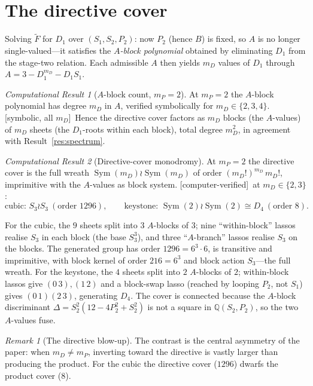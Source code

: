 \documentclass[11pt]{article}
\theoremstyle{plain}
\theoremstyle{definition}
\theoremstyle{remark}
\newtheorem{result}{Computational Result}
\newtheorem{remark}{Remark}
\newcommand{\Symbolic}{\textsf{[symbolic, all $m_D$]}}
\newcommand{\Measured}{\textsf{[computer-verified]}}
\newcommand{\Sym}{\operatorname{Sym}}
\newcommand{\Ftil}{\widetilde{F}}
\newcommand{\Q}{\mathbb{Q}}
\begin{document}
\section{The directive cover}
\label{sec:directive}

Solving $\Ftil$ for $D_1$ over $(S_1,S_2,P_2)$: now $P_2$ (hence $B$) is fixed, so
$A$ is no longer single-valued---it satisfies the \emph{$A$-block polynomial}
obtained by eliminating $D_1$ from the stage-two relation. Each admissible $A$
then yields $m_D$ values of $D_1$ through $A=3-D_1^{m_D}-D_1 S_1$.

\begin{result}[$A$-block count, $m_P=2$]
\label{res:ablock}
At $m_P=2$ the $A$-block polynomial has degree $m_D$ in $A$, verified symbolically
for $m_D\in\{2,3,4\}$. \Symbolic\ Hence the directive cover factors as $m_D$
blocks (the $A$-values) of $m_D$ sheets (the $D_1$-roots within each block), total
degree $m_D^2$, in agreement with Result~\ref{res:spectrum}.
\end{result}

\begin{result}[Directive-cover monodromy]
\label{res:directive}
At $m_P=2$ the directive cover is the full wreath $\Sym(m_D)\wr\Sym(m_D)$ of order
$(m_D!)^{m_D}\,m_D!$, imprimitive with the $A$-values as block system. \Measured\
at $m_D\in\{2,3\}$:
\[
  \text{cubic: } S_3\wr S_3 \ (\text{order } 1296),\qquad
  \text{keystone: } \Sym(2)\wr\Sym(2)\cong D_4 \ (\text{order } 8).
\]
\end{result}

\noindent For the cubic, the $9$ sheets split into $3$ $A$-blocks of $3$; nine
``within-block'' lassos realise $S_3$ in each block (the base $S_3^3$), and three
``$A$-branch'' lassos realise $S_3$ on the blocks. The generated group has order
$1296=6^3\cdot 6$, is transitive and imprimitive, with block kernel of order
$216=6^3$ and block action $S_3$---the full wreath. For the keystone, the $4$
sheets split into $2$ $A$-blocks of $2$; within-block lassos give $(0\,3),(1\,2)$
and a block-swap lasso (reached by looping $P_2$, not $S_1$) gives $(0\,1)(2\,3)$,
generating $D_4$. The cover is connected because the $A$-block discriminant
$\Delta = S_2^2(12-4P_2^2+S_2^2)$ is not a square in $\Q(S_2,P_2)$, so the two
$A$-values fuse.

\begin{remark}[The directive blow-up]
The contrast is the central asymmetry of the paper: when $m_D\neq m_P$, inverting
toward the directive is vastly larger than producing the product. For the cubic
the directive cover ($1296$) dwarfs the product cover ($8$).
\end{remark}
\end{document}
